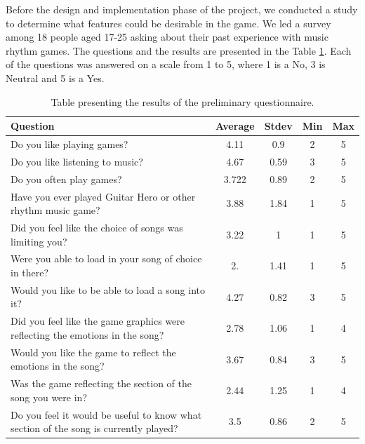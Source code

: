 Before the design and implementation phase of the project, we conducted a study to determine what features could be desirable in the game. We led a survey among 18 people aged 17-25 asking about their past experience with music rhythm games. 
The questions and the results are presented in the Table \ref{table:preliminaryquestions}. Each of the questions was answered on a scale from 1 to 5, where 1 is a No,  3 is Neutral and 5 is a Yes.

\begin{table}
\begin{center}
\begin{tabular}{| p{8cm} | c | c | c | c | } 																								      \hline 
\textbf{Question} & \textbf{Average} & \textbf{Stdev} & \textbf{Min} & \textbf{Max} 						   \\ \hline \hline
Do you like playing games? & 4.11 & 0.9 & 2 & 5		 					 					 									\\ \hline 
Do you like listening to music? & 4.67 & 0.59 & 3 & 5		 					 					 								\\ \hline 
Do you often play games? & 3.722 & 0.89 & 2 & 5 		 					 					 								\\ \hline 
Have you ever played Guitar Hero or other rhythm music game? & 3.88 & 1.84  & 1 & 5							\\ \hline 
Did you feel like the choice of songs was limiting you? & 3.22 & 1 & 1 & 5 					 							\\ \hline 
Were you able to load in your song of choice in there? & 2. & 1.41 & 1 & 5 					 							\\ \hline 
Would you like to be able to load a song into it? & 4.27 & 0.82 & 3 & 5 				 									\\ \hline 
Did you feel like the game graphics were reflecting the emotions in the song? & 2.78 & 1.06 & 1 & 4 			\\ \hline 
Would you like the game to reflect the emotions in the song? & 3.67 & 0.84 & 3 & 5 	 								\\ \hline 
Was the game reflecting the section of the song you were in? & 2.44 & 1.25 & 1 & 4  								\\ \hline 
Do you feel it would be useful to know what section of the song is currently played? & 3.5 & 0.86 & 2 & 5  	\\ \hline 
\end{tabular}
\caption{Table presenting the results of the preliminary questionnaire.}
\label{table:preliminaryquestions}
\end{center}
\end{table}

